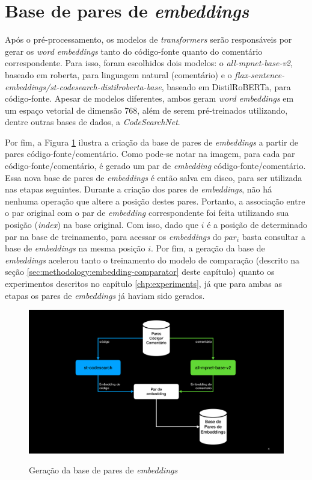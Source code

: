 \section{Base de pares de \textit{embeddings}}
\label{sec:methodology:encoders}
Após o pré-processamento, os modelos de \textit{transformers} serão responsáveis por gerar os \textit{word embeddings} tanto do código-fonte quanto do comentário correspondente. Para isso, foram escolhidos dois modelos: o \textit{all-mpnet-base-v2}, baseado em \gls{roberta}, para linguagem natural (comentário) e o \textit{flax-sentence-embeddings/st-codesearch-distilroberta-base}, baseado em DistilRoBERTa, para código-fonte. Apesar de modelos diferentes, ambos geram \textit{word embeddings} em um espaço vetorial de dimensão 768, além de serem pré-treinados utilizando, dentre outras bases de dados, a \textit{CodeSearchNet}.

Por fim, a Figura \ref{fig:metodology-db-embeddings} ilustra a criação da base de pares de \textit{embeddings} a partir de pares código-fonte/comentário. Como pode-se notar na imagem, para cada par código-fonte/comentário, é gerado um par de \textit{embedding} código-fonte/comentário. Essa nova base de pares de \textit{embeddings} é então salva em disco, para ser utilizada nas etapas seguintes. Durante a criação dos pares de \textit{embeddings}, não há nenhuma operação que altere a posição destes pares. Portanto, a associação entre o par original com o par de \textit{embedding} correspondente foi feita utilizando sua posição (\textit{index}) na base original. Com isso, dado que $i$ é a posição de determinado par na base de treinamento, para acessar os \textit{embeddings} do $par_i$ basta consultar a base de \textit{embeddings} na mesma posição $i$. Por fim, a geração da base de \textit{embeddings} acelerou tanto o treinamento do modelo de comparação (descrito na seção \ref{sec:methodology:embedding-comparator} deste capítulo) quanto os experimentos descritos no capítulo \ref{chp:experiments}, já que para ambas as etapas os pares de \textit{embeddings} já haviam sido gerados.

\begin{figure}[H]
    \centering
        \caption{Geração da base de pares de \textit{embeddings}}
        \includegraphics[scale=0.35]{db_embeddings.pdf}
        \label{fig:metodology-db-embeddings}
\end{figure}

